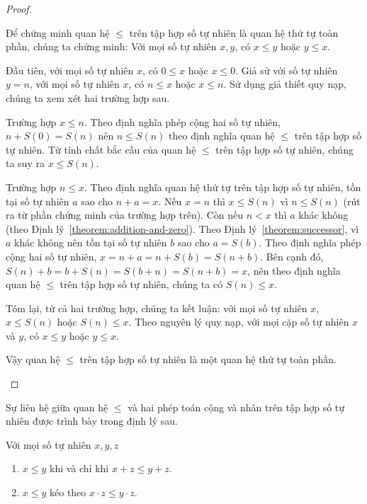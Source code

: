 \begin{proof}
\begin{enumerate}[label={(\roman*)}]
              Để chứng minh quan hệ $\leq$ trên tập hợp số tự nhiên là quan hệ thứ tự toàn phần, chúng ta chứng minh: Với mọi số tự nhiên $x, y$, có $x\leq y$ hoặc $y\leq x$.

              Đầu tiên, với mọi số tự nhiên $x$, có $0\leq x$ hoặc $x\leq 0$. Giả sử với số tự nhiên $y = n$, với mọi số tự nhiên $x$, có $n\leq x$ hoặc $x\leq n$. Sử dụng giả thiết quy nạp, chúng ta xem xét hai trường hợp sau.

              Trường hợp $x\leq n$. Theo định nghĩa phép cộng hai số tự nhiên, $n + S(0) = S(n)$ nên $n\leq S(n)$ theo định nghĩa quan hệ $\leq$ trên tập hợp số tự nhiên. Từ tính chất bắc cầu của quan hệ $\leq$ trên tập hợp số tự nhiên, chúng ta suy ra $x\leq S(n)$.

              Trường hợp $n\leq x$. Theo định nghĩa quan hệ thứ tự trên tập hợp số tự nhiên, tồn tại số tự nhiên $a$ sao cho $n + a = x$. Nếu $x = n$ thì $x\leq S(n)$ vì $n\leq S(n)$ (rút ra từ phần chứng minh của trường hợp trên). Còn nếu $n < x$ thì $a$ khác không (theo Định lý~\ref{theorem:addition-and-zero}). Theo Định lý~\ref{theorem:successor}, vì $a$ khác không nên tồn tại số tự nhiên $b$ sao cho $a = S(b)$. Theo định nghĩa phép cộng hai số tự nhiên, $x = n + a = n + S(b) = S(n + b)$. Bên cạnh đó, $S(n) + b = b + S(n) = S(b + n) = S(n + b) = x$, nên theo định nghĩa quan hệ $\leq$ trên tập hợp số tự nhiên, chúng ta có $S(n)\leq x$.

              Tóm lại, từ cả hai trường hợp, chúng ta kết luận: với mọi số tự nhiên $x$, $x\leq S(n)$ hoặc $S(n)\leq x$. Theo nguyên lý quy nạp, với mọi cặp số tự nhiên $x$ và $y$, có $x\leq y$ hoặc $y\leq x$.

              Vậy quan hệ $\leq$ trên tập hợp số tự nhiên là một quan hệ thứ tự toàn phần.\qedhere
    \end{enumerate}
\end{proof}

Sự liên hệ giữa quan hệ $\leq$ và hai phép toán cộng và nhân trên tập hợp số tự nhiên được trình bày trong định lý sau.
\begin{theorem}\label{theorem:natural-numbers-order}
    Với mọi số tự nhiên $x, y, z$
    \begin{enumerate}[label={(\roman*)}]
        \item $x\leq y$ khi và chỉ khi $x + z\leq y + z$.
        \item $x\leq y$ kéo theo $x\cdot z\leq y\cdot z$.
    \end{enumerate}
\end{theorem}

